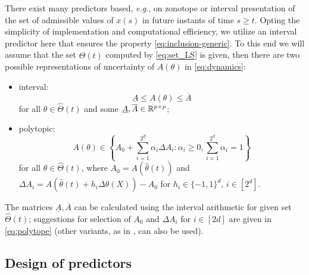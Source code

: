 \documentclass[letterpaper, 10 pt, conference]{ieeeconf}  %
\begin{document}
There exist many predictors based, \emph{e.g}., on zonotope \cite{le2012}
or interval \cite{Dinh2014,leurent2019interval} presentation of the
set of admissible values of $x(s)$ in future instants of time $s\geq t$.
Opting the simplicity of implementation and computational efficiency,
we utilize an interval predictor here that ensures the property \eqref{eq:inclusion-generic}.
To this end we will assume that the set $\hat{\Theta}(t)$ computed
by \eqref{eq:set_LS} is given, then there are two possible representations
of uncertainty of $A(\theta)$ in \eqref{eq:dynamics}:
\begin{itemize}
\item interval:
\begin{equation}
\underline{A}\leq A(\theta)\leq\overline{A}\label{eq:interval}
\end{equation}
for all $\theta\in\hat{\Theta}(t)$ and some $\underline{A},\overline{A}\in\mathbb{R}^{p\times p}$;
\item polytopic:
\begin{equation}
A(\theta)\in\left\{ A_{0}+\sum_{i=1}^{2^{d}}\alpha_{i}\Delta A_{i}:\alpha_{i}\geq0,\sum_{i=1}^{2^{d}}\alpha_{i}=1\right\} \label{eq:polytope}
\end{equation}
for all $\theta\in\hat{\Theta}(t)$, where $A_{0}=A(\hat{\theta}(t))$
and $\Delta A_{i}=A(\hat{\theta}(t) + h_{i}\Delta\theta(X))-A_0$ for $h_{i}\in\{-1,1\}^{d},\,i\in[2^d]$.
\end{itemize}
The matrices $\underline{A},\overline{A}$ can be calculated using
the interval arithmetic for given set $\hat{\Theta}(t)$; suggestions
for selection of $A_{0}$ and $\Delta A_{i}$ for $i\in[2d]$ are
given in \eqref{eq:polytope} (other variants, as in \cite{delos2015},
can also be used).

\subsection{Design of predictors}
\end{document}
